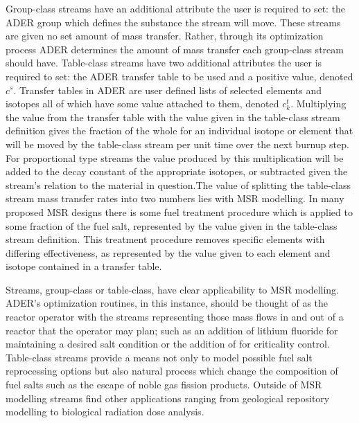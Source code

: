 Group-class streams have an additional attribute the user is required to set: 
the ADER group which defines the substance the stream will move. These streams
are given no set amount of mass transfer. Rather, through its optimization 
process
ADER determines the amount of mass transfer each group-class stream should
have. Table-class streams have two additional attributes the user is required to
set: the ADER transfer table to be used and a positive value, denoted
$c^{s}$.
Transfer tables in ADER are user defined lists of selected elements
and isotopes all of which have some value attached to them, 
denoted $c_{k}^{t}$. Multiplying the
value from the transfer table with the value given in the table-class stream
definition gives the fraction of the whole for an individual isotope or
element that will be moved by the table-class stream per unit time over
the next burnup step. For proportional type streams the value
produced by this multiplication will be added to the decay constant of the
appropriate isotopes, or subtracted given the stream's relation to the 
material in question.The value of splitting
the table-class stream mass transfer rates into two numbers lies with MSR
modelling. In many proposed MSR designs there is some fuel treatment procedure
which is applied to some fraction of the fuel salt, represented by the value
given in the table-class stream definition. This treatment procedure removes
specific elements with differing effectiveness, as represented by the value
given to each element and isotope contained in a transfer table.

Streams, group-class or table-class, have clear applicability to MSR modelling.
ADER's optimization routines, in this instance, should be thought of as
the reactor
operator with the streams representing those mass flows in and out of a 
reactor that
the operator may plan; such as an addition of lithium fluoride for maintaining
a desired salt condition or the addition of  for criticality
control. Table-class streams provide a means not only to model possible
fuel salt reprocessing options but also natural process which change the
composition of fuel salts such as the escape of noble gas fission products. 
Outside of MSR modelling streams find other applications ranging from geological
repository modelling to biological radiation dose analysis.


